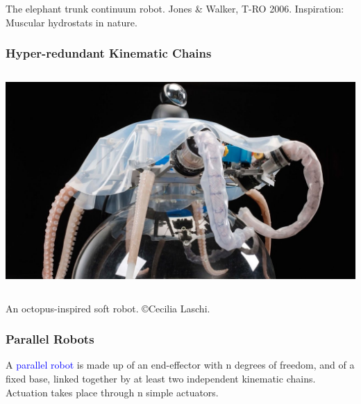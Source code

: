 \begin{frame}
\begin{columns}[b]
\begin{column}{.33\columnwidth}
\begin{tcolorbox}[colframe=blue!80!green, coltitle=white!80,toggle enlargement=none]
			\end{tcolorbox}
		\end{column}	
		\end{columns}
		\centering \footnotesize{The elephant trunk continuum robot. Jones \& Walker, T-RO 2006. Inspiration: Muscular hydrostats in nature.}
	\end{frame}

\begin{frame}
	\frametitle{Hyper-redundant Kinematic Chains}
	\begin{columns}[b]
		\begin{column}{.98\columnwidth}			
			\begin{tcolorbox}[colframe=blue!80!green, coltitle=white!80,toggle enlargement=none]
				\centering 
				\includegraphics[width=\textwidth]{../Notes/figures/octopus.jpg}
			\end{tcolorbox}
		\end{column}	
	\end{columns}
	 \centering \footnotesize{An octopus-inspired soft robot. \copyright Cecilia Laschi.}
\end{frame}
	
	
	\begin{frame}
		\frametitle{Parallel Robots}
		\begin{tcolorbox}[title=Mehlet 2015,toggle enlargement=none]
			A \textcolor{blue}{parallel robot} is made up of an end-effector with n degrees of freedom, and of a fixed base, linked together by at least two independent kinematic chains. Actuation takes place through n simple actuators.
		\end{tcolorbox}	
	\end{frame}
	
